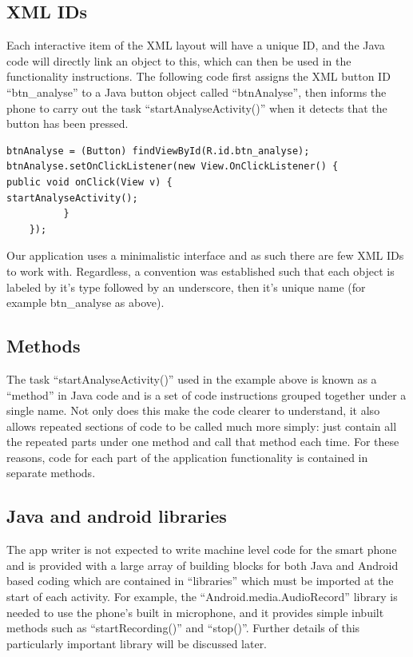 \subsection{XML IDs}
Each interactive item of the XML layout will have a unique ID, and the Java code will directly link an object to this, which can then be used in the functionality instructions. The following code first assigns the XML button ID ``btn\_analyse'' to a Java button object called ``btnAnalyse'', then informs the phone to carry out the task ``startAnalyseActivity()'' when it detects that the button has been pressed.
\begin{lstlisting}
btnAnalyse = (Button) findViewById(R.id.btn_analyse);
btnAnalyse.setOnClickListener(new View.OnClickListener() {
public void onClick(View v) {
startAnalyseActivity();
          }
    });
\end{lstlisting}
Our application uses a minimalistic interface and as such there are few XML IDs to work with. Regardless, a convention was established such that each object is labeled by it’s type followed by an underscore, then it’s unique name (for example btn\_analyse as above).
\subsection{Methods}
The task ``startAnalyseActivity()'' used in the example above is known as a ``method'' in Java code and is a set of code instructions grouped together under a single name. Not only does this make the code clearer to understand, it also allows repeated sections of code to be called much more simply: just contain all the repeated parts under one method and call that method each time. For these reasons, code for each part of the application functionality is contained in separate methods.
\subsection{Java and android libraries}
The app writer is not expected to write machine level code for the smart phone and is provided with a large array of building blocks for both Java and Android based coding which are contained in ``libraries'' which must be imported at the start of each activity. For example, the ``Android.media.AudioRecord'' library is needed to use the phone’s built in microphone, and it provides simple inbuilt methods such as ``startRecording()'' and ``stop()''. Further details of this particularly important library will be discussed later.
